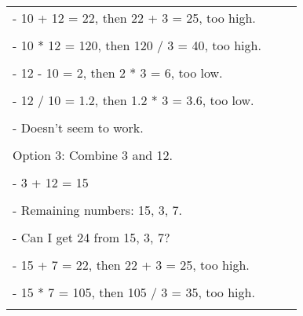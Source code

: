 \begin{table*}[ht]
\begin{tabular}{p{0.9\linewidth}}
- 10 + 12 = 22, then 22 + 3 = 25, too high.\\
\\
- 10 * 12 = 120, then 120 / 3 = 40, too high.\\
\\
- 12 - 10 = 2, then 2 * 3 = 6, too low.\\
\\
- 12 / 10 = 1.2, then 1.2 * 3 = 3.6, too low.\\
\\
- Doesn't seem to work.\\
\\
Option 3: Combine 3 and 12.\\
\\
- 3 + 12 = 15\\
\\
- Remaining numbers: 15, 3, 7.\\
\\
- Can I get 24 from 15, 3, 7?\\
\\
- 15 + 7 = 22, then 22 + 3 = 25, too high.\\
\\
- 15 * 7 = 105, then 105 / 3 = 35, too high.\\
\\ \bottomrule
\end{tabular}
\label{tab:qwq_LRM_game24_seal2}
\end{table*}

